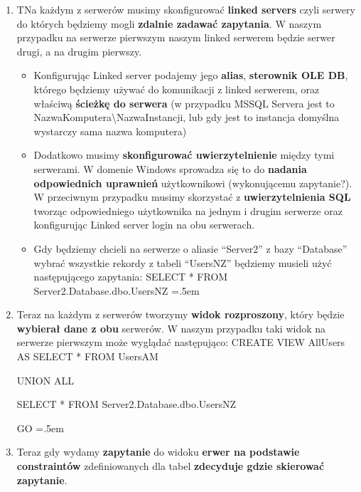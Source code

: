 \documentclass[a4paper]{article}
\newenvironment{lcverbatim}
{\SaveVerbatim{cverb}}
{\endSaveVerbatim
\flushleft\fboxrule=0pt\fboxsep=.5em
\colorbox{cverbbg}{%
\makebox[\dimexpr\linewidth-2\fboxsep][l]{\BUseVerbatim{cverb}}%
}
\endflushleft
}
\begin{document}
\begin{enumerate}
        \item TNa każdym z serwerów musimy skonfigurować \textbf{linked servers} czyli serwery do których będziemy
        mogli \textbf{zdalnie zadawać zapytania}. W naszym przypadku na serwerze pierwszym naszym linked serwerem
        będzie serwer drugi, a na drugim pierwszy.
        \begin{itemize}
            \item Konfigurując Linked server podajemy jego \textbf{alias}, \textbf{sterownik OLE DB}, którego będziemy
            używać do komunikacji z linked serwerem, oraz właściwą \textbf{ścieżkę do serwera} (w przypadku MSSQL
            Servera jest to NazwaKomputera\textbackslash NazwaInstancji, lub gdy jest to instancja domyślna wystarczy
            sama nazwa komputera)
            \item Dodatkowo musimy \textbf{skonfigurować uwierzytelnienie} między tymi serwerami. W domenie Windows
            sprowadza się to do \textbf{nadania odpowiednich uprawnień} użytkownikowi (wykonującemu zapytanie?). W
            przeciwnym przypadku musimy skorzystać z \textbf{uwierzytelnienia SQL} tworząc odpowiedniego
            użytkownika na jednym i drugim serwerze oraz konfigurując Linked server login na obu serwerach.
            \item Gdy będziemy chcieli na serwerze o aliasie ``Server2'' z bazy ``Database'' wybrać wszystkie rekordy
            z tabeli ``UsersNZ'' będziemy musieli użyć następującego zapytania:
            \begin{lcverbatim}
                SELECT *
                FROM Server2.Database.dbo.UsersNZ
            \end{lcverbatim}
        \end{itemize}

        \item Teraz na każdym z serwerów tworzymy \textbf{widok rozproszony}, który będzie \textbf{wybierał dane z obu}
        serwerów. W naszym przypadku taki widok na serwerze pierwszym może wyglądać następująco:
        \begin{lcverbatim}
            CREATE VIEW AllUsers
            AS
            SELECT *
            FROM UsersAM

            UNION ALL

            SELECT *
            FROM Server2.Database.dbo.UsersNZ

            GO
        \end{lcverbatim}

        \item Teraz gdy wydamy \textbf{zapytanie} do widoku \textbf{erwer na podstawie constraintów} zdefiniowanych
        dla tabel \textbf{zdecyduje gdzie skierować zapytanie}.
    \end{enumerate}
\end{document}
